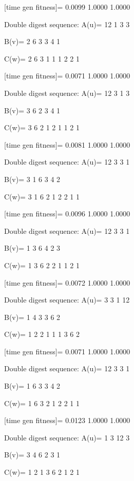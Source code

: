 [time gen fitness]=
    0.0099    1.0000    1.0000

Double digest sequence:
A(u)=
    12     1     3     3

B(v)=
     2     6     3     3     4     1

C(w)=
     2     6     3     1     1     1     2     2     1

[time gen fitness]=
    0.0071    1.0000    1.0000

Double digest sequence:
A(u)=
    12     3     1     3

B(v)=
     3     6     2     3     4     1

C(w)=
     3     6     2     1     2     1     1     2     1

[time gen fitness]=
    0.0081    1.0000    1.0000

Double digest sequence:
A(u)=
    12     3     3     1

B(v)=
     3     1     6     3     4     2

C(w)=
     3     1     6     2     1     2     2     1     1

[time gen fitness]=
    0.0096    1.0000    1.0000

Double digest sequence:
A(u)=
    12     3     3     1

B(v)=
     1     3     6     4     2     3

C(w)=
     1     3     6     2     2     1     1     2     1

[time gen fitness]=
    0.0072    1.0000    1.0000

Double digest sequence:
A(u)=
     3     3     1    12

B(v)=
     1     4     3     3     6     2

C(w)=
     1     2     2     1     1     1     3     6     2

[time gen fitness]=
    0.0071    1.0000    1.0000

Double digest sequence:
A(u)=
    12     3     3     1

B(v)=
     1     6     3     3     4     2

C(w)=
     1     6     3     2     1     2     2     1     1

[time gen fitness]=
    0.0123    1.0000    1.0000

Double digest sequence:
A(u)=
     1     3    12     3

B(v)=
     3     4     6     2     3     1

C(w)=
     1     2     1     3     6     2     1     2     1

